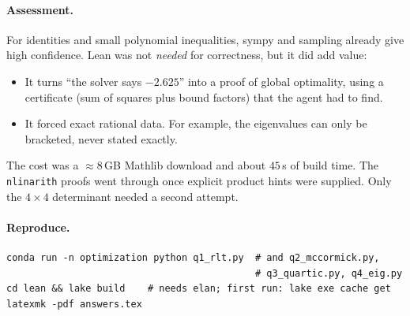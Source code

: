 \documentclass[11pt,fleqn]{article}
\newcommand{\code}[1]{\texttt{#1}}
\begin{document}
\paragraph{Assessment.}
For identities and small polynomial inequalities, sympy and sampling already give high
confidence. Lean was not \emph{needed} for correctness, but it did add value:
\begin{itemize}
\item It turns ``the solver says $-2.625$'' into a proof of global optimality, using a
  certificate (sum of squares plus bound factors) that the agent had to find.
\item It forced exact rational data. For example, the eigenvalues can only be bracketed,
  never stated exactly.
\end{itemize}
The cost was a $\approx 8$\,GB Mathlib download and about $45$\,s of build time. The
\code{nlinarith} proofs went through once explicit product hints were supplied. Only the
$4\times4$ determinant needed a second attempt.

\paragraph{Reproduce.}
\begin{verbatim}
conda run -n optimization python q1_rlt.py  # and q2_mccormick.py,
                                            # q3_quartic.py, q4_eig.py
cd lean && lake build    # needs elan; first run: lake exe cache get
latexmk -pdf answers.tex
\end{verbatim}
\end{document}
